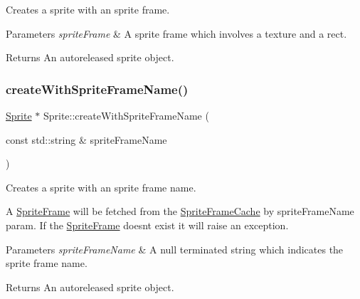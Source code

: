 Creates a sprite with an sprite frame.


\begin{DoxyParams}{Parameters}
{\em sprite\+Frame} & A sprite frame which involves a texture and a rect. \\
\hline
\end{DoxyParams}
\begin{DoxyReturn}{Returns}
An autoreleased sprite object. 
\end{DoxyReturn}
\mbox{\label{classSprite_adae417277d290022e3499d905ead5d5a}} 
\subsubsection{\texorpdfstring{create\+With\+Sprite\+Frame\+Name()}{createWithSpriteFrameName()}\hspace{0.1cm}{\footnotesize\ttfamily [1/2]}}
{\footnotesize\ttfamily \hyperlink{classSprite}{Sprite} $\ast$ Sprite\+::create\+With\+Sprite\+Frame\+Name (\begin{DoxyParamCaption}\item[{const std\+::string \&}]{sprite\+Frame\+Name }\end{DoxyParamCaption})\hspace{0.3cm}{\ttfamily [static]}}

Creates a sprite with an sprite frame name.

A \hyperlink{classSpriteFrame}{Sprite\+Frame} will be fetched from the \hyperlink{classSpriteFrameCache}{Sprite\+Frame\+Cache} by sprite\+Frame\+Name param. If the \hyperlink{classSpriteFrame}{Sprite\+Frame} doesn\textquotesingle{}t exist it will raise an exception.


\begin{DoxyParams}{Parameters}
{\em sprite\+Frame\+Name} & A null terminated string which indicates the sprite frame name. \\
\hline
\end{DoxyParams}
\begin{DoxyReturn}{Returns}
An autoreleased sprite object. 
\end{DoxyReturn}
\mbox{\label{classSprite_a1cd88febe986767b53977952c7d572b8}} 
